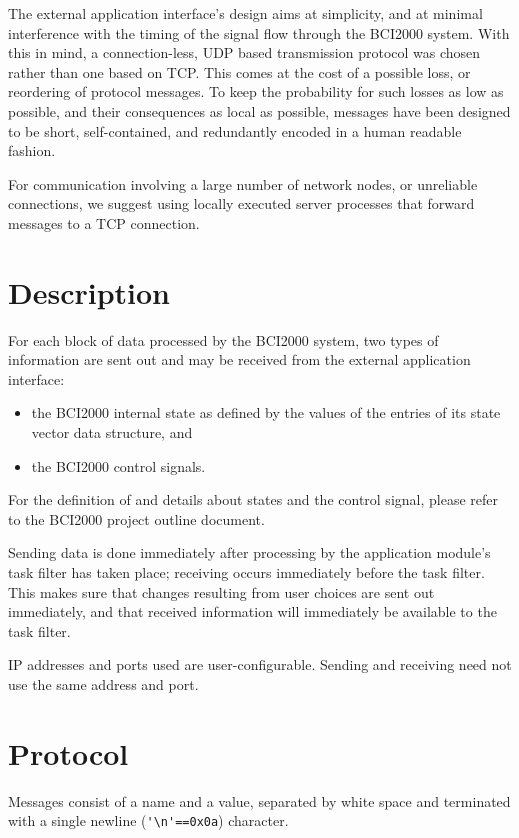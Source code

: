 \documentclass[12pt,letter,notitlepage]{article}
\begin{document}
The external application interface's design aims at simplicity, and at minimal 
interference with the timing of the signal flow through the BCI2000 system. With 
this in mind, a connection-less, UDP based transmission protocol was chosen 
rather than one based on TCP. This comes at the cost of a possible loss, or 
reordering of protocol messages. To keep the probability for such losses as low 
as possible, and their consequences as local as possible, messages have been 
designed to be short, self-contained, and redundantly encoded in a human 
readable fashion.

For communication involving a large number of network nodes, or unreliable connections, we suggest 
using locally executed server processes that forward messages to a TCP connection.

\section{Description}

For each block of data processed by the BCI2000 system, two types of information are sent out
and may be received from the external application interface:
\begin{itemize}
\item the BCI2000 internal state as defined by the values of the entries of its state vector data structure, and
\item the BCI2000 control signals.
\end{itemize}
For the definition of and details about states and the control signal, please refer to the BCI2000
project outline document.

Sending data is done immediately after processing by the application module's task filter has taken place; 
receiving occurs immediately before the task filter.
This makes sure that changes resulting from user choices are sent out immediately, and that 
received information will immediately be available to the task filter.

IP addresses and ports used are user-configurable. Sending and receiving need not use the same address and port.


\section{Protocol}

Messages consist of a name and a value, separated by white space
and terminated with a single newline (\verb|'\n'==0x0a|) character.
\end{document}
